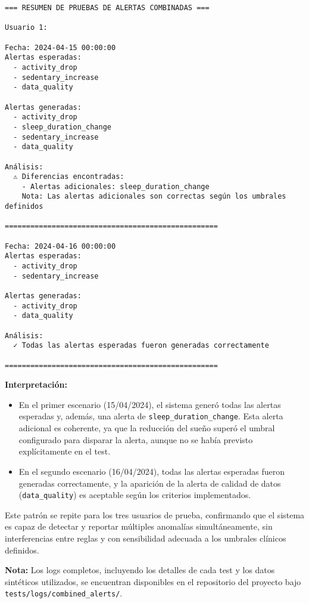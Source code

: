 \begin{verbatim}
=== RESUMEN DE PRUEBAS DE ALERTAS COMBINADAS ===

Usuario 1:

Fecha: 2024-04-15 00:00:00
Alertas esperadas:
  - activity_drop
  - sedentary_increase
  - data_quality

Alertas generadas:
  - activity_drop
  - sleep_duration_change
  - sedentary_increase
  - data_quality

Análisis:
  ⚠ Diferencias encontradas:
    - Alertas adicionales: sleep_duration_change
    Nota: Las alertas adicionales son correctas según los umbrales definidos

==================================================

Fecha: 2024-04-16 00:00:00
Alertas esperadas:
  - activity_drop
  - sedentary_increase

Alertas generadas:
  - activity_drop
  - data_quality

Análisis:
  ✓ Todas las alertas esperadas fueron generadas correctamente

==================================================
\end{verbatim}

\textbf{Interpretación:}
\begin{itemize}
    \item En el primer escenario (15/04/2024), el sistema generó todas las alertas esperadas y, además, una alerta de \texttt{sleep\_duration\_change}. Esta alerta adicional es coherente, ya que la reducción del sueño superó el umbral configurado para disparar la alerta, aunque no se había previsto explícitamente en el test.
    \item En el segundo escenario (16/04/2024), todas las alertas esperadas fueron generadas correctamente, y la aparición de la alerta de calidad de datos (\texttt{data\_quality}) es aceptable según los criterios implementados.
\end{itemize}

Este patrón se repite para los tres usuarios de prueba, confirmando que el sistema es capaz de detectar y reportar múltiples anomalías simultáneamente, sin interferencias entre reglas y con sensibilidad adecuada a los umbrales clínicos definidos.

\vspace{1em}
\noindent\textbf{Nota:} Los logs completos, incluyendo los detalles de cada test y los datos sintéticos utilizados, se encuentran disponibles en el repositorio del proyecto bajo \texttt{tests/logs/combined\_alerts/}.

